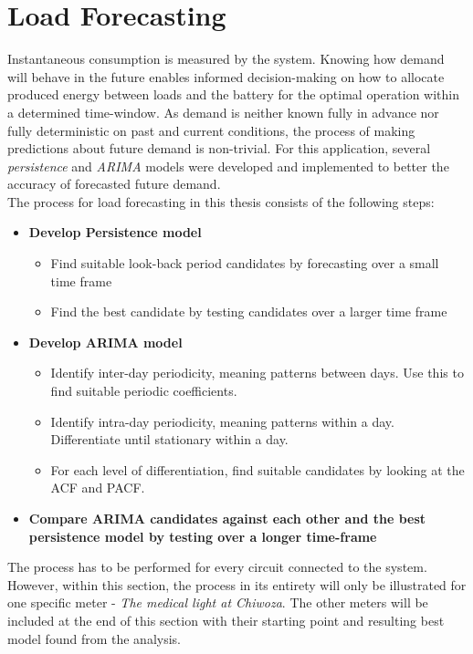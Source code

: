 \section{Load Forecasting }\label{seq:load_forecasting}

Instantaneous consumption is measured by the system. Knowing how demand will behave in the future enables informed decision-making on how to allocate produced energy between loads and the battery for the optimal operation within a determined time-window. As demand is neither known fully in advance nor fully deterministic on past and current conditions, the process of making predictions about future demand is non-trivial. For this application, several \textit{persistence} and \textit{ARIMA} models were developed and implemented to better the accuracy of forecasted future demand.\\

The process for load forecasting in this thesis consists of the following steps:
\begin{itemize}
    \item \textbf{Develop Persistence model}
    \begin{itemize}
        \item Find suitable look-back period candidates by forecasting over a small time frame
        \item Find the best candidate by testing candidates over a larger time frame 
    \end{itemize}
    \item \textbf{Develop ARIMA model}
    \begin{itemize}
        \item Identify inter-day periodicity, meaning patterns between days. Use this to find suitable periodic coefficients.
        \item Identify intra-day periodicity, meaning patterns within a day. Differentiate until stationary within a day.
        \item For each level of differentiation, find suitable candidates by looking at the ACF and PACF.
    \end{itemize} 
    \item \textbf{Compare ARIMA candidates against each other and the best persistence model by testing over a longer time-frame}
\end{itemize}

The process has to be performed for every circuit connected to the system. However, within this section, the process in its entirety will only be illustrated for one specific meter - \textit{The medical light at Chiwoza}. The other meters will be included at the end of this section with their starting point and resulting best model found from the analysis.\\

